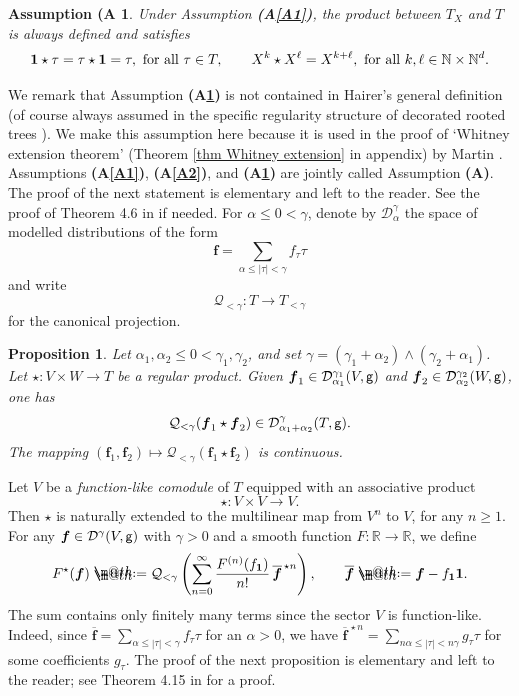 \documentclass[10pt, reqno]{amsart}
\makeatletter
\numberwithin{subsection}{section}
\numberwithin{subsubsection}{subsection}
\numberwithin{equation}{section} %
\theoremstyle{mystyle}
\newtheorem{prop}[thm]{\hspace{-0.13cm} {Proposition}}%
\theoremstyle{mystyle2}
\theoremstyle{mystyle3}
\newtheorem{assumA}{Assumption (A}
\newcommand{\refA}[1]{\textbf{\textsf{(A\ref{#1})}}}
\newcommand{\REFA}{\textbf{\textsf{(A)}}}
\newcommand{\bsf}{\boldsymbol{f}}
\newcommand\bbN{\mathbb{N}}
\newcommand\bbR{\mathbb{R}}
\newcommand{\mcD}{\mathcal{D}}
\newcommand{\mcQ}{\mathcal{Q}}
\newcommand*{\defeq}{\mathrel{\rlap{%
                     \raisebox{0.3ex}{$\m@th\cdot$}}%
                     \raisebox{-0.3ex}{$\m@th\cdot$}}%
                     =}
\makeatother
\begin{document}
\begin{assumA}\label{A3}
Under Assumption \refA{A1}, the product between $T_X$ and $T$ is always defined and satisfies
$$
{\bf1}\star\tau=\tau\star{\bf1}=\tau, \text{ for all } \tau\in T,\qquad X^k\star X^\ell=X^{k+\ell}, \text{ for all } k,\ell\in\bbN\times\bbN^d.
$$
\end{assumA}

\medskip

We remark that Assumption \refA{A3} is not contained in Hairer's general definition \cite{Hai14} (of course always assumed in the specific regularity structure of decorated rooted trees \cite{BHZ, ChandraHairer, BCCH18}). We make this assumption here because it is used in the proof of `Whitney extension theorem' (Theorem \ref{thm Whitney extension} in appendix) by Martin \cite{Martin}. Assumptions \refA{A1}, \refA{A2}, and \refA{A3} are jointly called Assumption \REFA. The proof of the next statement is elementary and left to the 
reader. See the proof of Theorem 4.6 in \cite{Hai14} if needed. For $\alpha\le0<\gamma$, denote by $\mcD_\alpha^\gamma$ the space of modelled distributions of the form
$$
\bsf=\sum_{\alpha\le\vert\tau\vert<\gamma}f_\tau\tau
$$
and write 
$$
\mcQ_{<\gamma} : T\to T_{<\gamma}
$$
for the canonical projection.

\medskip

\begin{prop} \label{PropRegularityProduct}
Let $\alpha_1,\alpha_2\le0<\gamma_1,\gamma_2$, and set $\gamma=(\gamma_1+\alpha_2)\wedge(\gamma_2+\alpha_1)$. Let $\star:V\times W\to T$ be a regular product. Given $\bsf_1\in\mcD_{\alpha_1}^{\gamma_1}(V,\sf g)$ and $\bsf_2\in\mcD_{\alpha_2}^{\gamma_2}(W,\sf g)$, one has
$$
\mcQ_{<\gamma}
(\bsf_1\star \bsf_2)\in\mcD_{\alpha_1+\alpha_2}^{\gamma}(T,\sf g).
$$
The mapping $(\bsf_1,\bsf_2)\mapsto \mcQ_{<\gamma}(\bsf_1\star \bsf_2)$ is continuous.
\end{prop}

\medskip

Let $V$ be a {\it function-like comodule} of $T$ equipped with an associative product
$$
\star:V\times V\to V.
$$
Then $\star$ is naturally extended to the multilinear map from $V^n$ to $V$, for any $n\geq 1$. For any $\bsf\in\mcD^\gamma(V,{\sf g})$ with $\gamma>0$ and a smooth function $F:\bbR\to\bbR$, we define
$$
F^\star(\bsf) \defeq  \mcQ_{<\gamma}\left(\sum_{n=0}^\infty \frac{F^{(n)}(f_{\bf1})}{n!}\,\overline{\bsf}^{\,\star n}\right), \qquad
\overline{\bsf} \defeq  \bsf-f_{\bf1}{\bf1}.
$$
The sum contains only finitely many terms since the sector $V$ is function-like.
Indeed, since $\overline{\bsf}=\sum_{\alpha\le|\tau|<\gamma}f_\tau\tau$ for an $\alpha>0$, we have $\overline{\bsf}^{\,\star n}=\sum_{n\alpha\le |\tau| <n\gamma}g_\tau\tau$ for some coefficients $g_\tau$. The proof of the next proposition is elementary and left to the reader; see Theorem 4.15 in \cite{Hai14} for a proof.
\end{document}
